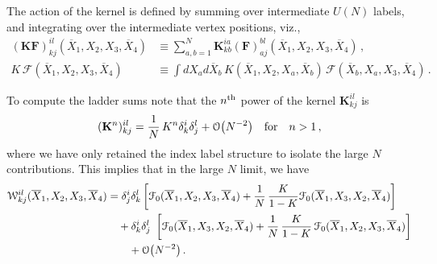 \documentclass[11pt]{article}
\newcommand{\Xb}{\overline{X}}
\begin{document}
%
The action of the kernel is defined by summing over intermediate $U(N)$ labels, and integrating over the intermediate vertex positions, viz.,  
%
\begin{equation}
\begin{split}
(\mathbf{K} \mathbf{F})^{il}_{kj}(\Xb_{1},X_{2},X_{3},\Xb_{4})
&\equiv 
\sum_{a,b=1}^N\mathbf{K}^{ia}_{kb}  (\mathbf{F})^{bl}_{aj}(\Xb_{1},X_{2},X_{3},\Xb_{4})\,, \\
K\, \mathcal{F}(\Xb_{1},X_{2},X_{3},\Xb_{4}) 
&\equiv 
  \int dX_{a}d\Xb_{b} \, K(\Xb_{1},X_{2},X_{a},\Xb_{b})  \, \mathcal{F}(\Xb_{b},X_{a},X_{3},\Xb_{4})\,.
\end{split}
\end{equation}
%


To compute the ladder sums note that the  $n^{\rm th}$ power of the kernel $\mathbf{K}^{il}_{kj}$ is 
%
\begin{equation}
\begin{split}
(\mathbf{K}^n)^{il}_{kj}= \frac{1}{N} \, K^n \delta^i_k\delta^l_j+ \order{N^{-2}}\quad{\rm for}\quad n>1\,,
\end{split}
\end{equation}  
%
where we have only retained the index label structure to isolate the large $N$ contributions.  This implies that in the large $N$ limit, we have
%
\begin{equation}\label{eq:4ptgeneralN}
\begin{split}
\mathcal{W}^{il}_{kj} (\Xb_{1},X_{2},X_{3},\Xb_{4})  
&=
  \delta^i_j\delta^l_k \left[
    \mathcal{F}_0(\Xb_{1},X_{2},X_{3},\Xb_{4})+ \frac{1}{N}\, \frac{K}{1-K} \mathcal{F}_0 (\Xb_{1},X_{3},X_{2},\Xb_{4})\right]
\\
&\quad+\delta^i_k\delta^l_j\
  \left[\mathcal{F}_0(\Xb_{1},X_{3},X_{2},\Xb_{4}) +  \frac{1}{N} \, 
    \frac{K}{1-K}\,  \mathcal{F}_0(\Xb_{1},X_{2},X_{3},\Xb_{4}) \right] \\
&\qquad    
  + \order{N^{-2}} \,.
\end{split}
\end{equation}  
%
\end{document}
